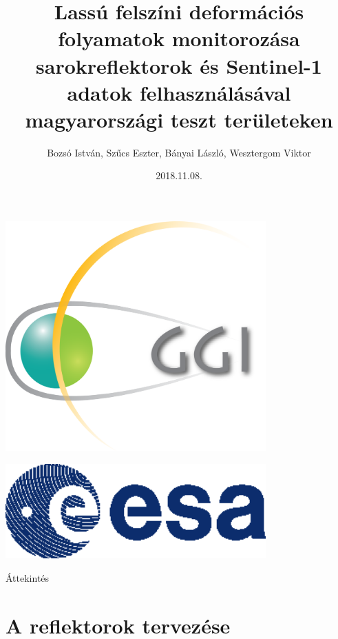 \documentclass[aspectratio=169]{beamer}
\title[XI. Geomatika Szeminárium, Sopron 2018]{Lassú felszíni deformációs folyamatok monitorozása sarokreflektorok és Sentinel-1 adatok felhasználásával magyarországi teszt területeken}
\author[Bozsó et al.]{Bozsó István, Szűcs Eszter, Bányai László, Wesztergom Viktor}
\institute[MTA CSFK GGI]{MTA CSFK Geodéziai és Geofizikai Intézet}
\date{2018.11.08.}
\begin{document}
\begin{frame}
    \titlepage
    \begin{center}
        \begin{minipage}[c]{0.25\textwidth}
            \includegraphics[width=0.75\textwidth]{ggi_logo.png}
        \end{minipage}
        \hspace{30pt}
        \begin{minipage}[c]{0.25\textwidth}
            \includegraphics[width=0.75\textwidth]{esa_logo.eps}
        \end{minipage}
    \end{center}
\end{frame}

\begin{frame}{Áttekintés}
    \tableofcontents
\end{frame}

\section{A reflektorok tervezése}
\end{document}
